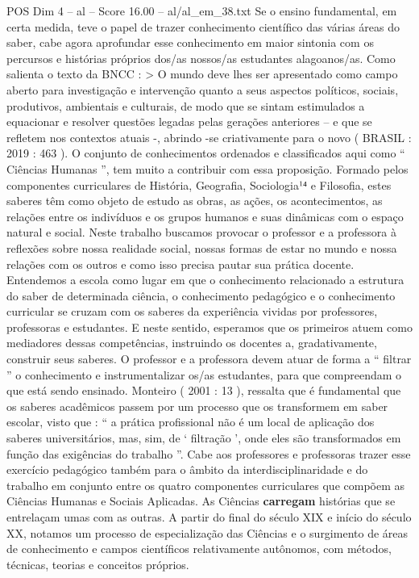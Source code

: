\begin{textsample}{POS Dim 4 – al – Score 16.00 – al/al\_em\_38.txt}
Se o ensino fundamental, em certa medida, teve o papel de trazer conhecimento científico das várias áreas do saber, cabe agora aprofundar esse conhecimento em maior sintonia com os percursos e histórias próprios dos/as nossos/as estudantes alagoanos/as.
Como salienta o texto da BNCC : > O mundo deve lhes ser apresentado como campo aberto para investigação e intervenção quanto a seus aspectos políticos, sociais, produtivos, ambientais e culturais, de modo que se sintam estimulados a equacionar e resolver questões legadas pelas gerações anteriores – e que se refletem nos contextos atuais -, abrindo -se criativamente para o novo ( BRASIL : 2019 : 463 ).
O conjunto de conhecimentos ordenados e classificados aqui como “ Ciências Humanas ”, tem muito a contribuir com essa proposição.
Formado pelos componentes curriculares de História, Geografia, Sociologia¹⁴ e Filosofia, estes saberes têm como objeto de estudo as obras, as ações, os acontecimentos, as relações entre os indivíduos e os grupos humanos e suas dinâmicas com o espaço natural e social.
Neste trabalho buscamos provocar o professor e a professora à reflexões sobre nossa realidade social, nossas formas de estar no mundo e nossa relações com os outros e como isso precisa pautar sua prática docente.
Entendemos a escola como lugar em que o conhecimento relacionado a estrutura do saber de determinada ciência, o conhecimento pedagógico e o conhecimento curricular se cruzam com os saberes da experiência vividas por professores, professoras e estudantes.
E neste sentido, esperamos que os primeiros atuem como mediadores dessas competências, instruindo os docentes a, gradativamente, construir seus saberes.
O professor e a professora devem atuar de forma a “ filtrar ” o conhecimento e instrumentalizar os/as estudantes, para que compreendam o que está sendo ensinado.
Monteiro ( 2001 : 13 ), ressalta que é fundamental que os saberes acadêmicos passem por um processo que os transformem em saber escolar, visto que : “ a prática profissional não é um local de aplicação dos saberes universitários, mas, sim, de ‘ filtração ’, onde eles são transformados em função das exigências do trabalho ”.
Cabe aos professores e professoras trazer esse exercício pedagógico também para o âmbito da interdisciplinaridade e do trabalho em conjunto entre os quatro componentes curriculares que compõem as Ciências Humanas e Sociais Aplicadas.
As Ciências \textbf{carregam} histórias que se entrelaçam umas com as outras.
A partir do final do século XIX e início do século XX, notamos um processo de especialização das Ciências e o surgimento de áreas de conhecimento e campos científicos relativamente autônomos, com métodos, técnicas, teorias e conceitos próprios.

\end{textsample}
